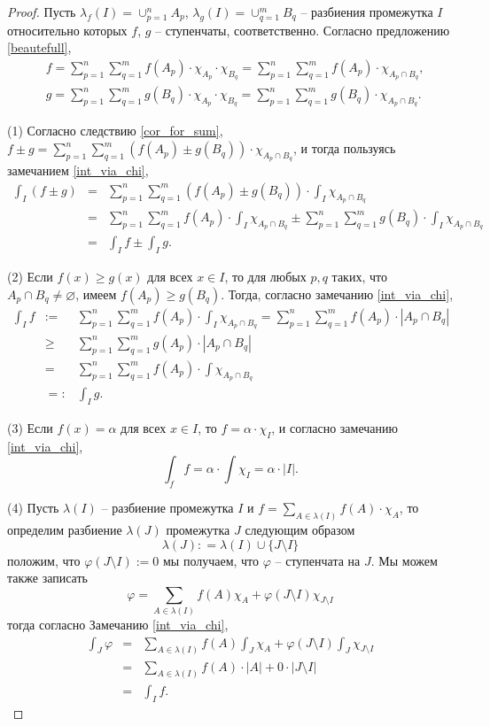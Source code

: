 \begin{proof}

Пусть $\lambda_f(I)  =  \cup_{p=1}^n A_p$, $\lambda_g(I) =  \cup_{q=1}^m B_q$ -- разбиения промежутка $I$ относительно которых $f$, $g$ -- ступенчаты, соответственно. Согласно предложению \ref{beautefull},
  \begin{align*}
        & f =  \sum_{p=1}^n\sum_{q=1}^m f(A_p) \cdot \chi_{A_p}\cdot \chi_{B_q} = \sum_{p=1}^n\sum_{q=1}^m f(A_p) \cdot \chi_{A_p\cap B_q}, \\
        & g=  \sum_{p=1}^n\sum_{q=1}^m g(B_q) \cdot \chi_{A_p} \cdot \chi_{B_q} = \sum_{p=1}^n\sum_{q=1}^m g(B_q) \cdot \chi_{A_p\cap B_q}.
    \end{align*}

(1) Согласно следствию \ref{cor_for_sum}, $f\pm g = \sum_{p=1}^n\sum_{q=1}^m (f(A_p) \pm g(B_q)) \cdot \chi_{A_p\cap B_q}$, и тогда пользуясь замечанием \ref{int_via_chi},
\begin{eqnarray*}
    \int_I (f\pm g) &=& \sum_{p=1}^n\sum_{q=1}^m (f(A_p) \pm g(B_q)) \cdot \int_I \chi_{A_p \cap B_q} \\
    &=&\sum_{p=1}^n\sum_{q=1}^m f(A_p) \cdot \int_I \chi_{A_p \cap B_q} \pm \sum_{p=1}^n\sum_{q=1}^m g(B_q) \cdot \int_I \chi_{A_p \cap B_q} \\
    &=& \int_I f \pm \int_I g.
\end{eqnarray*}

(2) Если $f(x) \ge g(x)$ для всех $x\in I$, то для любых $p,q$ таких, что $A_p \cap B_q \ne \varnothing$, имеем $f(A_p) \ge g(B_q)$. Тогда, согласно замечанию \ref{int_via_chi},
\begin{eqnarray*}
    \int_I f &:=&  \sum_{p=1}^n\sum_{q=1}^m f(A_p) \cdot \int_I \chi_{A_p \cap B_q} = \sum_{p=1}^n\sum_{q=1}^m f(A_p) \cdot |A_p \cap B_q| \\
    &\ge & \sum_{p=1}^n\sum_{q=1}^m g(A_p) \cdot |A_p \cap B_q| \\
    &=& \sum_{p=1}^n\sum_{q=1}^m f(A_p) \cdot \int \chi_{A_p \cap B_q} \\
    &=:& \int_I g.
\end{eqnarray*}

(3) Если $f(x) = \alpha$ для всех $x\in I$, то $f = \alpha \cdot \chi_I$, и согласно замечанию \ref{int_via_chi},
\[
 \int_f f = \alpha\cdot \int \chi_I = \alpha \cdot |I|.
\]

(4) Пусть $\lambda(I)$ -- разбиение промежутка $I$ и $f = \sum_{A \in \lambda(I)} f(A) \cdot \chi_A$, то определим разбиение $\lambda(J)$ промежутка $J$ следующим образом
\[
 \lambda(J): = \lambda(I) \cup \{J\setminus I\}
\]
положим, что $\varphi(J\setminus I) :=0$ мы получаем, что $\varphi$ -- ступенчата на $J.$ Мы можем также записать
\[
 \varphi = \sum_{A \in \lambda(I)} f(A) \chi_A + \varphi(J\setminus I) \chi_{J \setminus I}
\]
тогда согласно Замечанию \ref{int_via_chi},
\begin{eqnarray*}
  \int_J \varphi &=& \sum_{A \in \lambda(I)} f(A) \int_J \chi_A + \varphi(J\setminus I) \int_J \chi_{J \setminus I}   \\
 &=& \sum_{A \in \lambda(I)} f(A) \cdot |A| + 0 \cdot |J \setminus I|\\
 &=& \int_I f.
\end{eqnarray*}


\end{proof}
